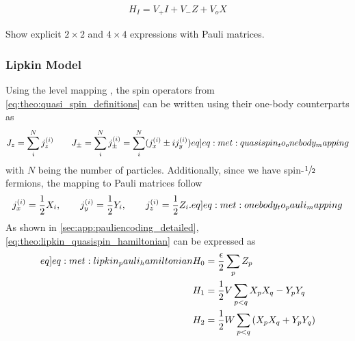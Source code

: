\begin{align*}
    H_I = V_+ I + V_- Z + V_o X
\end{align*}

Show explicit $2\times 2$ and $4\times 4$ expressions with Pauli matrices.
\subsubsection{Lipkin Model}
Using the level mapping , the spin operators from \cref{eq:theo:quasi_spin_definitions} can be written using their one-body counterparts as 
\begin{align}
    J_z = \sum_{i}^{N} \spinsmall{z}{i} \hspace{20px} J_\pm = \sum_i^N \spinsmall{\pm}{i} = \sum_i^N (\spinsmall{x}{i}\pm i\spinsmall{y}{i}) \label[eq]{eq:met:quasispin_to_onebody_mapping}
\end{align}
with $N$ being the number of particles. Additionally, since we have spin-$\sfrac{1}{2}$ fermions, the mapping to Pauli matrices follow
\begin{align}
    \spinsmall{x}{i} = \frac{1}{2}X_i,\hspace{20px}\spinsmall{y}{i} = \frac{1}{2}Y_i,\hspace{20px}\spinsmall{z}{i} = \frac{1}{2}Z_i. \label[eq]{eq:met:onebody_to_pauli_mapping}
\end{align}
As shown in \cref{sec:app:pauliencoding_detailed}, \cref{eq:theo:lipkin_quasispin_hamiltonian} can be expressed as
\begin{align}
    \begin{split}\label[eq]{eq:met:lipkin_pauli_hamiltonian}
        H_0 &= \frac{\epsilon}{2}\sum_{p}Z_p  \\
        H_1 &= \frac{1}{2}V \sum_{p < q} X_p X_q - Y_p Y_q \\
        H_2 &= \frac{1}{2}W \sum_{p < q} \pclosed{ X_p X_q + Y_p Y_q } 
    \end{split}
\end{align}
